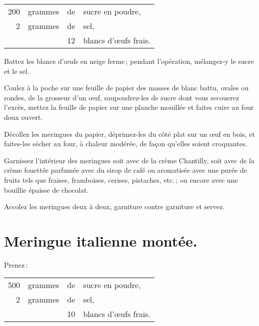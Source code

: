 \footnotesize
\begin{longtable}{rrrp{16em}}
    200 & grammes & de & sucre en poudre,                                                                 \\
      2 & grammes & de & sel,                                                                             \\
        &         & 12 & blancs d'œufs frais.                                                             \\
\end{longtable}
\normalsize

Battez les blancs d'œufs en neige ferme ; pendant l'opération, mélangez‑y le
sucre et le sel.

Coulez à la poche sur une feuille de papier des masses de blanc battu, ovales
ou rondes, de la grosseur d'un œuf, saupoudrez-les de sucre dont vous secouerez
l'excès, mettez la feuille de papier sur une planche mouillée et faites cuire
au four doux ouvert.

Décollez les meringues du papier, déprimez-les du côté plat sur un œuf en bois,
et faites-les sécher au four, à chaleur modérée, de façon qu'elles soient
croquantes.

Garnissez l'intérieur des meringues soit avec de la crème Chantilly, soit avec
de la crème fouettée parfumée avec du sirop de café ou aromatisée avec une
purée de fruits tels que fraises, framboises, cerises, pistaches, etc. ; ou
encore avec une bouillie épaisse de chocolat.

Accolez les meringues deux à deux, garniture contre garniture et servez.

\section*{\centering Meringue italienne montée.}
{}

Prenez :

\footnotesize
\begin{longtable}{rrrp{16em}}
    500 & grammes & de & sucre en poudre,                                                                 \\
      2 & grammes & de & sel,                                                                             \\
        &         & 10 & blancs d'œufs frais.                                                             \\
\end{longtable}
\normalsize

